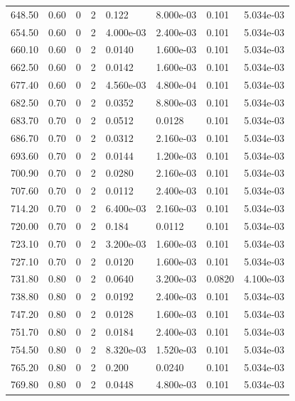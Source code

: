 \documentclass[preview]{standalone}
\begin{document}
{{{{{\begin{tabular}{L{1.2cm}C{1.2cm} C{0.3cm}C{0.5cm} C{1.4cm}C{1.4cm} C{1.4cm}C{1.4cm}}
  648.50  &  0.60  & 0     &  2 &  0.122  & 8.000e-03  & 0.101 &  5.034e-03   \\ 
  654.50  &  0.60  & 0     &  2 &  4.000e-03  & 2.400e-03  & 0.101 &  5.034e-03   \\ 
  660.10  &  0.60  & 0     &  2 &  0.0140  & 1.600e-03  & 0.101 &  5.034e-03   \\ 
  662.50  &  0.60  & 0     &  2 &  0.0142  & 1.600e-03  & 0.101 &  5.034e-03   \\ 
  677.40  &  0.60  & 0     &  2 &  4.560e-03  & 4.800e-04  & 0.101 &  5.034e-03   \\ 
  682.50  &  0.70  & 0     &  2 &  0.0352  & 8.800e-03  & 0.101 &  5.034e-03   \\ 
  683.70  &  0.70  & 0     &  2 &  0.0512  & 0.0128  & 0.101 &  5.034e-03   \\ 
  686.70  &  0.70  & 0     &  2 &  0.0312  & 2.160e-03  & 0.101 &  5.034e-03   \\ 
  693.60  &  0.70  & 0     &  2 &  0.0144  & 1.200e-03  & 0.101 &  5.034e-03   \\ 
  700.90  &  0.70  & 0     &  2 &  0.0280  & 2.160e-03  & 0.101 &  5.034e-03   \\ 
  707.60  &  0.70  & 0     &  2 &  0.0112  & 2.400e-03  & 0.101 &  5.034e-03   \\ 
  714.20  &  0.70  & 0     &  2 &  6.400e-03  & 2.160e-03  & 0.101 &  5.034e-03   \\ 
  720.00  &  0.70  & 0     &  2 &  0.184  & 0.0112  & 0.101 &  5.034e-03   \\ 
  723.10  &  0.70  & 0     &  2 &  3.200e-03  & 1.600e-03  & 0.101 &  5.034e-03   \\ 
  727.10  &  0.70  & 0     &  2 &  0.0120  & 1.600e-03  & 0.101 &  5.034e-03   \\ 
  731.80  &  0.80  & 0     &  2 &  0.0640  & 3.200e-03  & 0.0820 &  4.100e-03   \\ 
  738.80  &  0.80  & 0     &  2 &  0.0192  & 2.400e-03  & 0.101 &  5.034e-03   \\ 
  747.20  &  0.80  & 0     &  2 &  0.0128  & 1.600e-03  & 0.101 &  5.034e-03   \\ 
  751.70  &  0.80  & 0     &  2 &  0.0184  & 2.400e-03  & 0.101 &  5.034e-03   \\ 
  754.50  &  0.80  & 0     &  2 &  8.320e-03  & 1.520e-03  & 0.101 &  5.034e-03   \\ 
  765.20  &  0.80  & 0     &  2 &  0.200  & 0.0240  & 0.101 &  5.034e-03   \\ 
  769.80  &  0.80  & 0     &  2 &  0.0448  & 4.800e-03  & 0.101 &  5.034e-03   \\ 

\end{tabular}}}}}}
\end{document}
